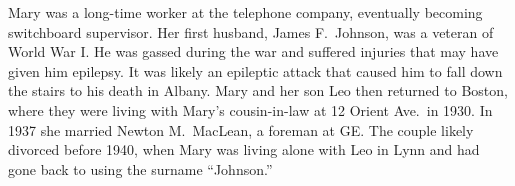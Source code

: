 Mary was a long-time worker at the telephone company, eventually becoming switchboard supervisor.\cite{Mary4DugganPhone} Her first husband, James F.\ Johnson, was a veteran of World War I. He was gassed during the war and suffered injuries that may have given him epilepsy. It was likely an epileptic attack that caused him to fall down the stairs to his death in Albany.\cite{JamesJohnsonFall} Mary and her son Leo then returned to Boston, where they were living with Mary's cousin-in-law at 12 Orient Ave.\ in 1930.\cite{Census1930Mary4Duggan} In 1937 she married Newton M.\ MacLean, a foreman at GE.\cite{Mary4Duggan1939} The couple likely divorced before 1940, when Mary was living alone with Leo in Lynn and had gone back to using the surname ``Johnson.''\cite{Census1940Mary4Duggan}

